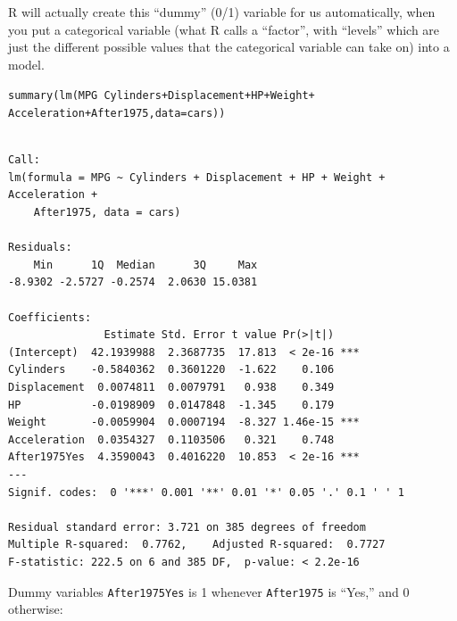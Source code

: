 \documentclass{beamer}\usepackage[]{graphicx}\usepackage[]{color}
\makeatletter
\newcommand{\hlopt}[1]{\textcolor[rgb]{1,0.894,0.769}{#1}}%
\newcommand{\hlstd}[1]{\textcolor[rgb]{1,0.894,0.769}{#1}}%
\newcommand{\hlkwc}[1]{\textcolor[rgb]{0.78,0.941,0.545}{#1}}%
\newcommand{\hlkwd}[1]{\textcolor[rgb]{1,0.78,0.769}{#1}}%
\newenvironment{kframe}{%
 \def\at@end@of@kframe{}%
 \ifinner\ifhmode%
  \def\at@end@of@kframe{\end{minipage}}%
  \begin{minipage}{\columnwidth}%
 \fi\fi%
 \def\FrameCommand##1{\hskip\@totalleftmargin \hskip-\fboxsep
 \colorbox{shadecolor}{##1}\hskip-\fboxsep
     \hskip-\linewidth \hskip-\@totalleftmargin \hskip\columnwidth}%
 \MakeFramed {\advance\hsize-\width
   \@totalleftmargin\z@ \linewidth\hsize
   \@setminipage}}%
 {\par\unskip\endMakeFramed%
 \at@end@of@kframe}
\newenvironment{knitrout}{}{} %
\makeatother
\begin{document}
\begin{darkframes}
    \begin{frame}
      \begin{center}
        R will actually create this ``dummy'' (0/1) variable for us automatically, when you put a categorical variable (what R calls a ``factor'', with ``levels'' which are just the different possible values that the categorical variable can take on) into a model.
      \end{center}
    \end{frame}

    \begin{frame}[fragile]
      \fontsm
\begin{knitrout}
\begin{kframe}
\begin{alltt}
\hlkwd{summary}\hlstd{(}\hlkwd{lm}\hlstd{(MPG} \hlopt{~} \hlstd{Cylinders} \hlopt{+} \hlstd{Displacement} \hlopt{+} \hlstd{HP} \hlopt{+} \hlstd{Weight} \hlopt{+}
    \hlstd{Acceleration} \hlopt{+} \hlstd{After1975,} \hlkwc{data}\hlstd{=cars))}
\end{alltt}
\begin{verbatim}

Call:
lm(formula = MPG ~ Cylinders + Displacement + HP + Weight + Acceleration + 
    After1975, data = cars)

Residuals:
    Min      1Q  Median      3Q     Max 
-8.9302 -2.5727 -0.2574  2.0630 15.0381 

Coefficients:
               Estimate Std. Error t value Pr(>|t|)    
(Intercept)  42.1939988  2.3687735  17.813  < 2e-16 ***
Cylinders    -0.5840362  0.3601220  -1.622    0.106    
Displacement  0.0074811  0.0079791   0.938    0.349    
HP           -0.0198909  0.0147848  -1.345    0.179    
Weight       -0.0059904  0.0007194  -8.327 1.46e-15 ***
Acceleration  0.0354327  0.1103506   0.321    0.748    
After1975Yes  4.3590043  0.4016220  10.853  < 2e-16 ***
---
Signif. codes:  0 '***' 0.001 '**' 0.01 '*' 0.05 '.' 0.1 ' ' 1

Residual standard error: 3.721 on 385 degrees of freedom
Multiple R-squared:  0.7762,	Adjusted R-squared:  0.7727 
F-statistic: 222.5 on 6 and 385 DF,  p-value: < 2.2e-16
\end{verbatim}
\end{kframe}
\end{knitrout}
    \end{frame}

    \begin{frame}[fragile]{Dummy variables}
      \texttt{After1975Yes} is 1 whenever \texttt{After1975} is ``Yes,'' and 0 otherwise:


\end{frame}
\end{darkframes}
\end{document}
